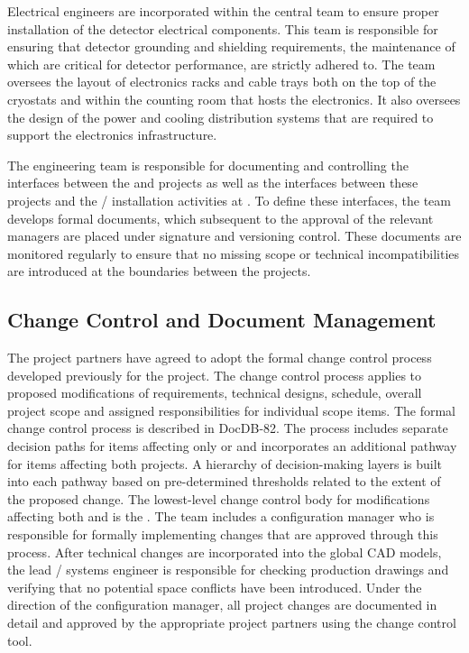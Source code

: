 Electrical engineers are incorporated within the central
 team to ensure proper  installation 
of the detector electrical components.  This team is responsible 
for ensuring that detector grounding and shielding requirements, 
the maintenance of which are critical for detector performance, 
are strictly adhered to.  The team oversees the layout of 
electronics racks and cable trays both on the top of the cryostats 
and within the  counting room that hosts the  
electronics.  It also oversees the design of the power and cooling 
distribution systems that are required to support the electronics 
infrastructure.

The  engineering team is responsible for documenting and
controlling the interfaces between the  and  
projects as well as the interfaces between these projects and the 
/  installation activities 
at .  To define these interfaces, the  team 
develops formal documents, which subsequent to the approval of the 
relevant managers are placed under signature and versioning control.  
These documents are monitored regularly to ensure that no missing 
scope or technical incompatibilities are introduced at the boundaries 
between the projects.

\subsection{Change Control and Document Management}
\label{sec:dune_changecontrol}

The  project partners have agreed to adopt 
the formal change control process developed previously for the 
 project.  The change control process applies to 
proposed modifications of requirements, technical designs, 
schedule, overall project scope and assigned responsibilities 
for individual scope items.  The formal  
change control process is described in DocDB-82.  The 
process includes separate decision paths for items affecting 
only  or  and incorporates an additional 
pathway for items affecting both projects.  A hierarchy of 
decision-making layers is built into each pathway based on 
pre-determined thresholds related to the extent of the proposed 
change.  The lowest-level change control body for modifications 
affecting both  and  is the .  
The  team includes a configuration manager who is 
responsible for formally implementing changes that are approved 
through this process.  After technical changes are incorporated 
into the global \threed CAD models, the lead / 
systems engineer is responsible for checking production drawings 
and verifying that no potential space conflicts have been 
introduced.  Under the direction of the configuration manager, 
all project changes are documented in detail and approved by 
the appropriate project partners using the  change 
control tool.

